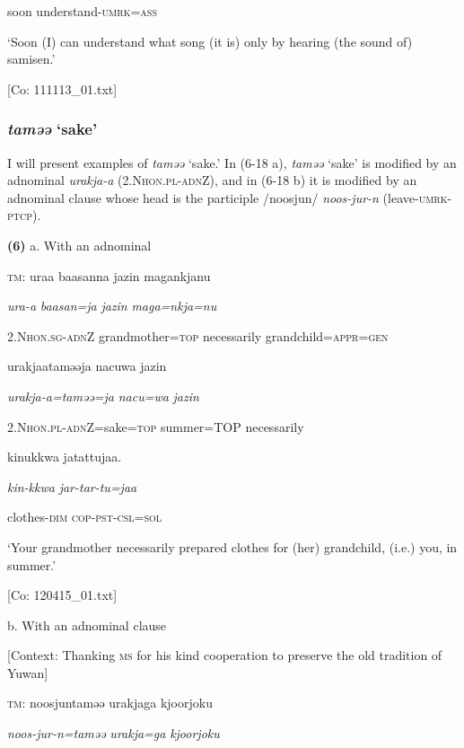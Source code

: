       soon  understand-\textsc{umrk}=\textsc{ass}

      ‘Soon (I) can understand what song (it is) only by hearing (the sound of) samisen.’

      [Co: 111113\_01.txt]

\subsubsection{\textit{taməə} ‘sake’}

I will present examples of \textit{taməə} ‘sake.’ In (6-18 a), \textit{taməə} ‘sake’ is modified by an adnominal \textit{urakja-a} (2.N\textsc{hon}.\textsc{pl}-\textsc{adn}Z), and in (6-18 b) it is modified by an adnominal clause whose head is the participle /noosjun/ \textit{noos-jur-n} (leave-\textsc{umrk}-\textsc{ptcp}).

\textbf{(6)}  a.  With an adnominal

    \textsc{tm}:  uraa  baasanna  jazin  magankjanu

      \textit{ura-a}  \textit{baasan=ja}  \textit{jazin}  \textit{maga=nkja=nu}

      2.N\textsc{hon}.\textsc{sg}-\textsc{adn}Z  grandmother=\textsc{top}  necessarily  grandchild=\textsc{appr}=\textsc{gen}

      urakjaataməəja  {\textbar}nacuwa{\textbar}  jazin

      \textit{urakja-a=taməə=ja}  \textit{nacu=wa}  \textit{jazin}

      2.N\textsc{hon}.\textsc{pl}-\textsc{adn}Z=sake=\textsc{top}  summer=TOP  necessarily

      kinukkwa  jatattujaa.

      \textit{kin-kkwa}  \textit{jar-tar-tu=jaa}

      clothes-\textsc{dim}  \textsc{cop}-\textsc{pst}-\textsc{csl}=\textsc{sol}

      ‘Your grandmother necessarily prepared clothes for (her) grandchild, (i.e.) you, in summer.’

      [Co: 120415\_01.txt]

  b.  With an adnominal clause

    [Context: Thanking \textsc{ms} for his kind cooperation to preserve the old tradition of Yuwan]

    \textsc{tm}:  noosjuntaməə  urakjaga  {\textbar}kjoorjoku{\textbar}

      \textit{noos-jur-n=taməə}  \textit{urakja=ga}  \textit{kjoorjoku}

